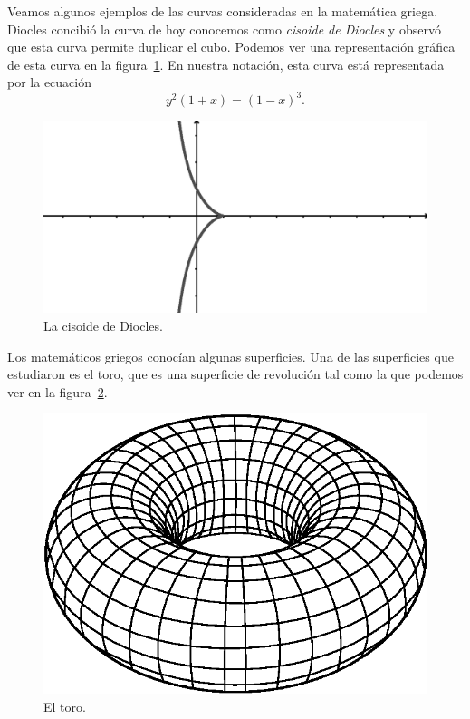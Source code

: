 Veamos algunos ejemplos de las curvas consideradas en la matemática griega. 
Diocles concibió la curva de hoy conocemos como \emph{cisoide de Diocles} y observó que
esta curva permite duplicar el cubo. Podemos ver una representación gráfica de
esta curva en la figura~\ref{fig:cisoide}. En nuestra notación, esta curva
está representada por la ecuación
\[
	y^2(1+x)=(1-x)^3.
\]

\begin{figure}
   \centering
   \includegraphics[scale=0.3]{images/cisoide}
   \caption{La cisoide de Diocles.}
   \label{fig:cisoide}
\end{figure}

Los matemáticos griegos conocían algunas superficies. Una de las superficies
que estudiaron es el toro, que es una superficie de revolución tal como la que
podemos ver en la figura~\ref{fig:toro}. 

\begin{figure}
   \centering
   \includegraphics[scale=0.3]{images/toro}
   \caption{El toro.}
   \label{fig:toro}
\end{figure}

